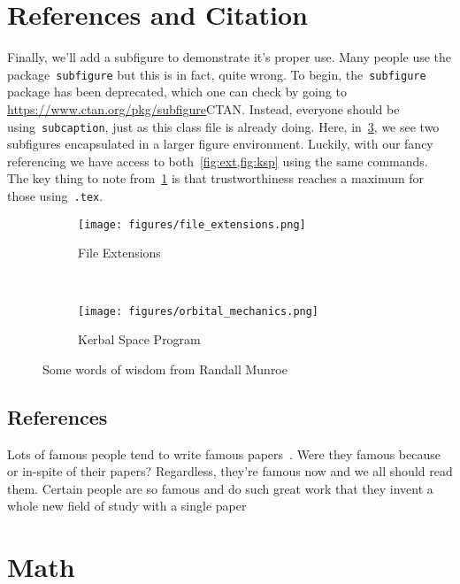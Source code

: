\section{References and Citation}
Finally, we'll add a subfigure to demonstrate it's proper use. 
Many people use the package~\verb+subfigure+ but this is in fact, quite wrong. 
To begin, the~\verb+subfigure+ package has been deprecated, which one can check by going to \url{https://www.ctan.org/pkg/subfigure}{CTAN}.
Instead, everyone should be using~\verb+subcaption+, just as this class file is already doing.
Here, in~\cref{fig:xkcd}, we see two subfigures encapsulated in a larger figure environment.
Luckily, with our fancy referencing we have access to both~\cref{fig:ext,fig:ksp} using the same commands.
The key thing to note from~\cref{fig:ext} is that trustworthiness reaches a maximum for those using~\verb+.tex+.
\begin{figure}[htbp] 
    \centering 
    \begin{subfigure}[htbp]{0.5\textwidth} 
        \texttt{[image: figures/file\_extensions.png]} 
        \caption{File Extensions} \label{fig:ext} 
    \end{subfigure}~ %
    \begin{subfigure}[htbp]{0.5\textwidth} 
        \texttt{[image: figures/orbital\_mechanics.png]} 
        \caption{Kerbal Space Program} \label{fig:ksp} 
    \end{subfigure}
    \caption[XKCD]{Some words of wisdom from Randall Munroe}
    \label{fig:xkcd} 
\end{figure}

\subsection{References}

Lots of famous people tend to write famous papers~\cite{newton1999}. 
Were they famous because or in-spite of their papers?
Regardless, they're famous now and we all should read them.
Certain people are so famous and do such great work that they invent a whole new field of study with a single paper~\cite{kalman1960,shannon1949}

\section{Math}

